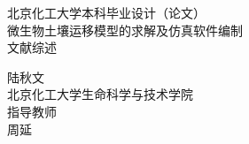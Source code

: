 \begin{titlepage}
\thispagestyle{empty}
\newcommand{\HRule}{\rule{\linewidth}{0.5mm}} %

\center %
 

\vspace*{1.2cm}
\textsc{ 北京化工大学本科毕业设计（论文）}\\[2.8cm] %


\vspace*{1.2cm}
{\heiti {}微生物土壤运移模型的求解及仿真软件编制 \biaosong{} \\ [0.8cm]文献综述}\\[1cm] %
\vspace*{1.2cm}
 

{\kaishu\large
陆秋文\\
北京化工大学生命科学与技术学院\\[0.5cm]}
指导教师\\
{\large\kaishu 周\quad 延}


\end{titlepage}
